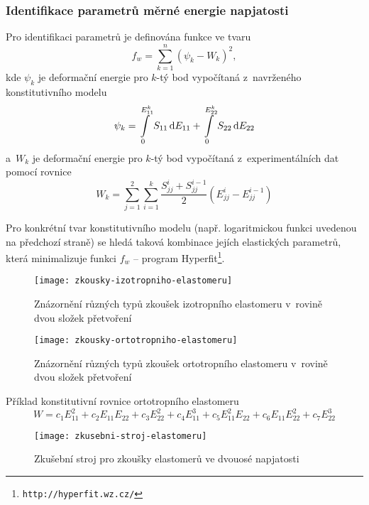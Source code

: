 \subsubsection{Identifikace parametrů měrné energie napjatosti}
Pro identifikaci parametrů je definována funkce ve tvaru
\begin{equation}
	f_w = \sum\limits_{k=1}^n \left(\psi_k - W_k\right)^2,
\end{equation}
kde $\psi_k$ je deformační energie pro $k$-tý bod vypočítaná z~navrženého konstitutivního modelu
\begin{equation}
	\psi_k = \int\limits_0^{E^k_{11}} S_{11} \,\mathrm{d} E_{11} + \int\limits_0^{E^k_{22}} S_{22} \,\mathrm{d} E_{22}
\end{equation}
a~$W_k$ je deformační energie pro $k$-tý bod vypočítaná z~experimentálních dat pomocí rovnice
\begin{equation}
	W_k = \sum\limits_{j=1}^2 \sum\limits_{i=1}^k \frac{S_{jj}^i + S_{jj}^{i-1}}{2} \left(E_{jj}^i - E_{jj}^{i-1}\right)
\end{equation}

Pro konkrétní tvar konstitutivního modelu (např. logaritmickou funkci uvedenou na předchozí straně) se hledá taková kombinace jejích elastických parametrů, která minimalizuje funkci $f_w$ -- program Hyperfit\footnote{\texttt{http://hyperfit.wz.cz/}}.

\begin{figure}[H]
	\centering
	\texttt{[image: zkousky-izotropniho-elastomeru]}
	\caption[Zkoušky izotropního elastomeru]{Znázornění různých typů zkoušek izotropního elastomeru v~rovině dvou složek přetvoření}
	\label{fig:zkousky-izotropniho-elastomeru}
\end{figure}

\begin{figure}[H]
	\centering
	\texttt{[image: zkousky-ortotropniho-elastomeru]}
	\caption[Zkoušky ortotropního elastomeru]{Znázornění různých typů zkoušek ortotropního elastomeru v~rovině dvou složek přetvoření}
	\label{fig:zkousky-ortotropniho-elastomeru}
\end{figure}

Příklad konstitutivní rovnice ortotropního elastomeru
\begin{equation}
	W = c_1 E_{11}^2 + c_2 E_{11} E_{22} + c_3 E_{22}^2 + c_4 E_{11}^3 + c_5 E_{11}^2 E_{22} + c_6 E_{11} E_{22}^2 + c_7 E_{22}^3
\end{equation}

\begin{figure}[H]
	\centering
	\texttt{[image: zkusebni-stroj-elastomeru]}
	\caption{Zkušební stroj pro zkoušky elastomerů ve dvouosé napjatosti}
	\label{fig:zkusebni-stroj-elastomeru}
\end{figure}

